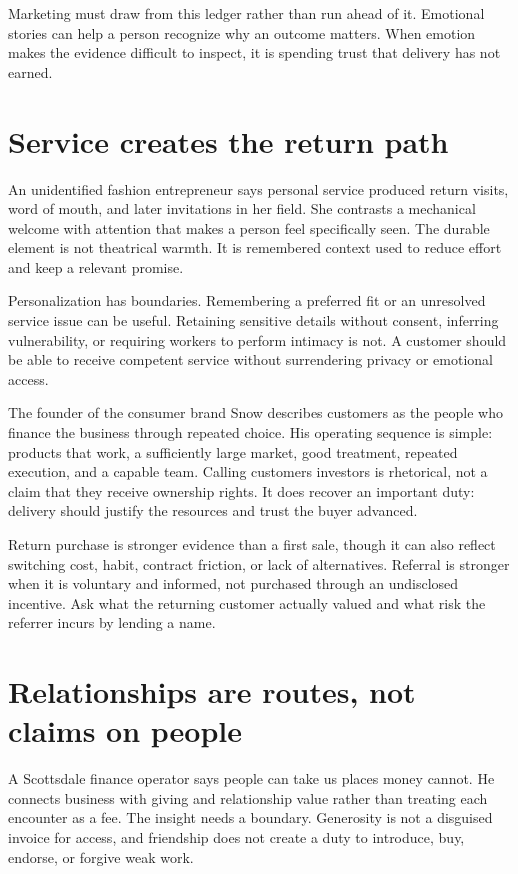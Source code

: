 Marketing must draw from this ledger rather than run ahead of it. Emotional
stories can help a person recognize why an outcome matters. When emotion makes
the evidence difficult to inspect, it is spending trust that delivery has not
earned.

\section{Service creates the return path}

An unidentified fashion entrepreneur says personal service produced return
visits, word of mouth, and later invitations in her field. She contrasts a
mechanical welcome with attention that makes a person feel specifically seen.
The durable element is not theatrical warmth. It is remembered context used to
reduce effort and keep a relevant promise.

Personalization has boundaries. Remembering a preferred fit or an unresolved
service issue can be useful. Retaining sensitive details without consent,
inferring vulnerability, or requiring workers to perform intimacy is not. A
customer should be able to receive competent service without surrendering
privacy or emotional access.

The founder of the consumer brand Snow describes customers as the people who
finance the business through repeated choice. His operating sequence is simple:
products that work, a sufficiently large market, good treatment, repeated
execution, and a capable team. Calling customers investors is rhetorical, not
a claim that they receive ownership rights. It does recover an important duty:
delivery should justify the resources and trust the buyer advanced.

Return purchase is stronger evidence than a first sale, though it can also
reflect switching cost, habit, contract friction, or lack of alternatives.
Referral is stronger when it is voluntary and informed, not purchased through
an undisclosed incentive. Ask what the returning customer actually valued and
what risk the referrer incurs by lending a name.

\section{Relationships are routes, not claims on people}

A Scottsdale finance operator says people can take us places money cannot. He
connects business with giving and relationship value rather than treating each
encounter as a fee. The insight needs a boundary. Generosity is not a disguised
invoice for access, and friendship does not create a duty to introduce, buy,
endorse, or forgive weak work.

